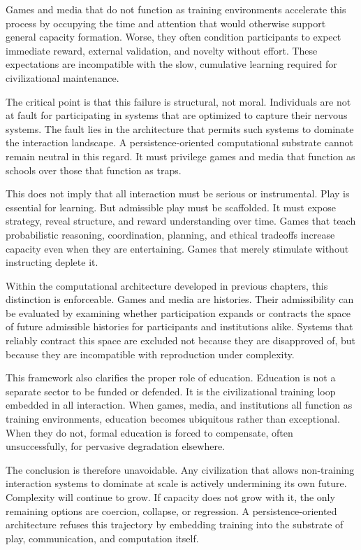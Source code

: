 \documentclass[12pt,oneside]{book}
\begin{document}
Games and media that do not function as training environments accelerate this process by occupying the time and attention that would otherwise support general capacity formation. Worse, they often condition participants to expect immediate reward, external validation, and novelty without effort. These expectations are incompatible with the slow, cumulative learning required for civilizational maintenance.

The critical point is that this failure is structural, not moral. Individuals are not at fault for participating in systems that are optimized to capture their nervous systems. The fault lies in the architecture that permits such systems to dominate the interaction landscape. A persistence-oriented computational substrate cannot remain neutral in this regard. It must privilege games and media that function as schools over those that function as traps.

This does not imply that all interaction must be serious or instrumental. Play is essential for learning. But admissible play must be scaffolded. It must expose strategy, reveal structure, and reward understanding over time. Games that teach probabilistic reasoning, coordination, planning, and ethical tradeoffs increase capacity even when they are entertaining. Games that merely stimulate without instructing deplete it.

Within the computational architecture developed in previous chapters, this distinction is enforceable. Games and media are histories. Their admissibility can be evaluated by examining whether participation expands or contracts the space of future admissible histories for participants and institutions alike. Systems that reliably contract this space are excluded not because they are disapproved of, but because they are incompatible with reproduction under complexity.

This framework also clarifies the proper role of education. Education is not a separate sector to be funded or defended. It is the civilizational training loop embedded in all interaction. When games, media, and institutions all function as training environments, education becomes ubiquitous rather than exceptional. When they do not, formal education is forced to compensate, often unsuccessfully, for pervasive degradation elsewhere.

The conclusion is therefore unavoidable. Any civilization that allows non-training interaction systems to dominate at scale is actively undermining its own future. Complexity will continue to grow. If capacity does not grow with it, the only remaining options are coercion, collapse, or regression. A persistence-oriented architecture refuses this trajectory by embedding training into the substrate of play, communication, and computation itself.
\end{document}
